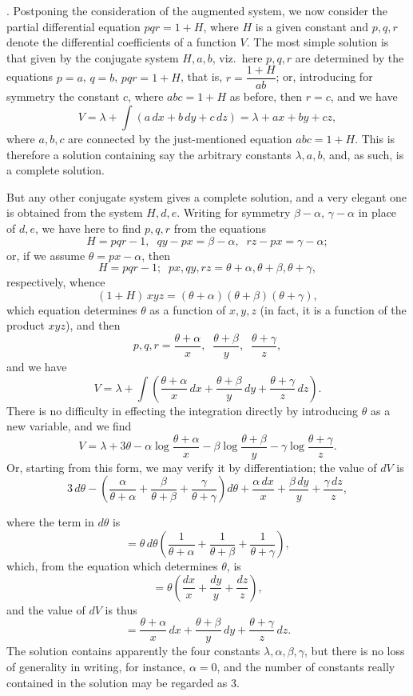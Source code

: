 \documentclass[11pt,a4paper]{article}
\begin{document}
\medskip

. Postponing the consideration of the augmented system, we now consider the partial differential equation $pqr = 1 + H$, where $H$ is a given constant and $p, q, r$ denote the differential coefficients of a function $V$. The most simple solution is that given by the conjugate system $H, a, b$, viz.\ here $p, q, r$ are determined by the equations $p = a$, $q = b$, $pqr = 1 + H$, that is, $r = \dfrac{1 + H}{ab}$; or, introducing for symmetry the constant $c$, where $abc = 1 + H$ as before, then $r = c$, and we have
\[
V = \lambda + \int (a\,dx + b\,dy + c\,dz) = \lambda + ax + by + cz,
\]
where $a, b, c$ are connected by the just-mentioned equation $abc = 1 + H$. This is therefore a solution containing say the arbitrary constants $\lambda, a, b$, and, as such, is a complete solution.

But any other conjugate system gives a complete solution, and a very elegant one is obtained from the system $H, d, e$. Writing for symmetry $\beta - \alpha$, $\gamma - \alpha$ in place of $d, e$, we have here to find $p, q, r$ from the equations
\[
H = pqr - 1, \;\; qy - px = \beta - \alpha, \;\; rz - px = \gamma - \alpha;
\]
or, if we assume $\theta = px - \alpha$, then
\[
H = pqr - 1; \;\; px, qy, rz = \theta + \alpha, \theta + \beta, \theta + \gamma,
\]
respectively, whence
\[
(1 + H)\,xyz = (\theta + \alpha)(\theta + \beta)(\theta + \gamma),
\]
which equation determines $\theta$ as a function of $x, y, z$ (in fact, it is a function of the product $xyz$), and then
\[
p, q, r = \frac{\theta + \alpha}{x}, \;\; \frac{\theta + \beta}{y}, \;\; \frac{\theta + \gamma}{z},
\]
and we have
\[
V = \lambda + \int\!\left( \frac{\theta + \alpha}{x}\,dx + \frac{\theta + \beta}{y}\,dy + \frac{\theta + \gamma}{z}\,dz \right).
\]
There is no difficulty in effecting the integration directly by introducing $\theta$ as a new variable, and we find
\[
V = \lambda + 3\theta - \alpha\log\frac{\theta + \alpha}{x} - \beta\log\frac{\theta + \beta}{y} - \gamma\log\frac{\theta + \gamma}{z}.
\]
Or, starting from this form, we may verify it by differentiation; the value of $dV$ is
\[
3\,d\theta - \!\left(\frac{\alpha}{\theta + \alpha} + \frac{\beta}{\theta + \beta} + \frac{\gamma}{\theta + \gamma}\right) d\theta + \frac{\alpha\,dx}{x} + \frac{\beta\,dy}{y} + \frac{\gamma\,dz}{z},
\]

\newpage


where the term in $d\theta$ is
\[
= \theta\,d\theta\!\left( \frac{1}{\theta + \alpha} + \frac{1}{\theta + \beta} + \frac{1}{\theta + \gamma} \right),
\]
which, from the equation which determines $\theta$, is
\[
= \theta\!\left( \frac{dx}{x} + \frac{dy}{y} + \frac{dz}{z} \right),
\]
and the value of $dV$ is thus
\[
= \frac{\theta + \alpha}{x}\,dx + \frac{\theta + \beta}{y}\,dy + \frac{\theta + \gamma}{z}\,dz.
\]
The solution contains apparently the four constants $\lambda, \alpha, \beta, \gamma$, but there is no loss of generality in writing, for instance, $\alpha = 0$, and the number of constants really contained in the solution may be regarded as 3.
\end{document}
